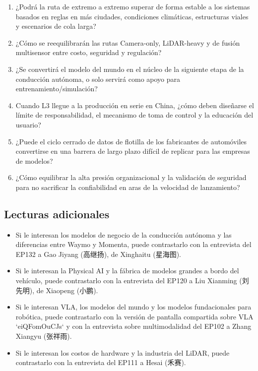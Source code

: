 \documentclass[a4paper]{article}
\begin{document}
\begin{enumerate}
\item ¿Podrá la ruta de extremo a extremo superar de forma estable a los sistemas basados en reglas en más ciudades, condiciones climáticas, estructuras viales y escenarios de cola larga?
\item ¿Cómo se reequilibrarán las rutas Camera-only, LiDAR-heavy y de fusión multisensor entre costo, seguridad y regulación?
\item ¿Se convertirá el modelo del mundo en el núcleo de la siguiente etapa de la conducción autónoma, o solo servirá como apoyo para entrenamiento/simulación?
\item Cuando L3 llegue a la producción en serie en China, ¿cómo deben diseñarse el límite de responsabilidad, el mecanismo de toma de control y la educación del usuario?
\item ¿Puede el ciclo cerrado de datos de flotilla de los fabricantes de automóviles convertirse en una barrera de largo plazo difícil de replicar para las empresas de modelos?
\item ¿Cómo equilibrar la alta presión organizacional y la validación de seguridad para no sacrificar la confiabilidad en aras de la velocidad de lanzamiento?
\end{enumerate}

\subsection{Lecturas adicionales}

\begin{itemize}
\item Si le interesan los modelos de negocio de la conducción autónoma y las diferencias entre Waymo y Momenta, puede contrastarlo con la entrevista del EP132 a Gao Jiyang (高继扬), de Xinghaitu (星海图).
\item Si le interesan la Physical AI y la fábrica de modelos grandes a bordo del vehículo, puede contrastarlo con la entrevista del EP120 a Liu Xianming (刘先明), de Xiaopeng (小鹏).
\item Si le interesan VLA, los modelos del mundo y los modelos fundacionales para robótica, puede contrastarlo con la versión de pantalla compartida sobre VLA `eiQFomOuCJs` y con la entrevista sobre multimodalidad del EP102 a Zhang Xiangyu (张祥雨).
\item Si le interesan los costos de hardware y la industria del LiDAR, puede contrastarlo con la entrevista del EP111 a Hesai (禾赛).
\end{itemize}
\end{document}
